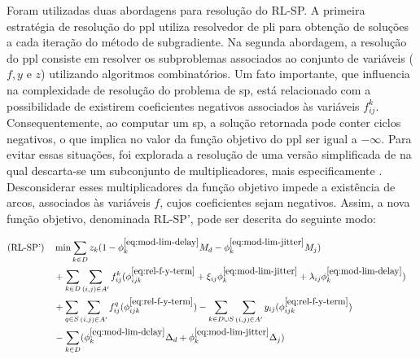 Foram utilizadas duas abordagens para  resolução do RL-SP. A primeira estratégia
de  resolução do  \gls{ppl} utiliza  resolvedor  de \gls{pli}  para obtenção  de
soluções a  cada iteração  do método  de subgradiente.  Na segunda  abordagem, a
resolução  do  \gls{ppl} consiste  em  resolver  os subproblemas  associados  ao
conjunto de  variáveis ($f,  y$ e $z$)  utilizando algoritmos  combinatórios. Um
fato  importante, que  influencia na  complexidade de  resolução do  problema de
\gls{sp},  está  relacionado  com  a  possibilidade  de  existirem  coeficientes
negativos associados às variáveis $f_{ij}^{k}$. Consequentemente, ao computar um
\gls{sp}, a  solução retornada pode  conter ciclos  negativos, o que  implica no
valor da função  objetivo do \gls{ppl} ser igual a  $-\infty$. Para evitar essas
situações, foi  explorada a resolução  de uma  versão simplificada de  {\rlu} na
qual  descarta-se  um  subconjunto   de  multiplicadores,  mais  especificamente
\mult{\ref{eq:mod-var-delay}}{}. Desconsiderar  esses multiplicadores  da função
objetivo  impede a  existência  de  arcos, associados  às  variáveis $f$,  cujos
coeficientes sejam negativos. Assim, a  nova função objetivo, denominada RL-SP',
pode ser descrita do seguinte modo:


\begin{align}
\text{(RL-SP')} \quad 
    & \nonumber \displaystyle \min \sum_{k \in D}z_k (1 - \phi^{\ref{eq:mod-lim-delay}}_{k}M_d - \phi^{\ref{eq:mod-lim-jitter}}_{k}M_j) & \\ 
    & \nonumber \displaystyle + \sum_{k \in D} \sum_{(i, j) \in A'} f_{ij}^{k} (\phi^{\ref{eq:rel-f-y-term}}_{ijk} + \xi_{ij} \phi^{\ref{eq:mod-lim-jitter}}_{k} + \lambda_{ij} \phi^{\ref{eq:mod-lim-delay}}_{k}) & \\
    & \nonumber \displaystyle + \sum_{q \in S} \sum_{(i, j) \in A'} f_{ij}^{q}(\phi^{
    \ref{eq:rel-f-y-term}}_{ijk}) - \sum_{k \in D \cup S} \sum_{(i, j) \in A'} y_{ij}(\phi^{\ref{eq:rel-f-y-term}}_{ijk}) & \\ 
    & \displaystyle - \sum_{k \in D} (\phi^{\ref{eq:mod-lim-delay}}_{k} \Delta_d + \phi^{\ref{eq:mod-lim-jitter}}_{k} \Delta_j) & \label{eq:fo-rlsp-weaker}
\end{align}

